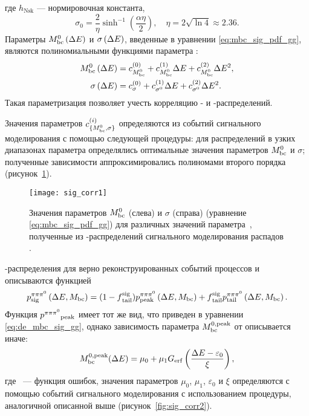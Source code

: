 где $h_{\textrm{Nsk}}$ --- нормировочная константа,
\begin{equation}\label{eq:NskParams}
 \sigma_0 = \frac{2}{\eta} \sinh^{-1}\left(\frac{\alpha\eta}{2}\right),\quad
 \eta = 2\sqrt{\ln{4}}\approx 2.36.
\end{equation}
Параметры $M_{\mathrm{bc}}^0\left(\Delta E\right)$ и $\sigma\left(\Delta E\right)$, введенные в уравнении \eqref{eq:mbc_sig_pdf_gg}, являются полиномиальными функциями параметра \de:
\begin{equation}\label{eq:de_mbc_sig_gg_corr}
\begin{split}
 M_{\mathrm{bc}}^0\left(\Delta E\right) &= c^{(0)}_{M_{\mathrm{bc}}^0} + c^{(1)}_{M_{\mathrm{bc}}^0}\Delta E + c^{(2)}_{M_{\mathrm{bc}}^0}\Delta E^2,\\
 \sigma\left(\Delta E\right) &= c^{(0)}_{\sigma} + c^{(1)}_{\sigma^0}\Delta E + c^{(2)}_{\sigma^0}\Delta E^2.
\end{split}
\end{equation}
Такая параметризация позволяет учесть корреляцию \de- и \mbc-распределений.  

Значения параметров $c^{(i)}_{\{M_{\mathrm{bc}}^0,\sigma\}}$ определяются из событий сигнального моделирования с помощью следующей процедуры: для \mbc распределений в узких диапазонах параметра \de определялись оптимальные значения параметров $M_{\mathrm{bc}}^0$ и $\sigma$; полученные зависимости аппроксимировались полиномами второго порядка (рисунок~\ref{fig:sig_corr1}).

\begin{figure}[H]
 \centering
  \texttt{[image: sig\_corr1]}\\
  \caption{Значения параметров $M_{\mathrm{bc}}^0$ (слева) и $\sigma$ (справа) (уравнение \eqref{eq:mbc_sig_pdf_gg}) для различных значений параметра~\de, полученные из \mbc-распределений сигнального моделирования распадов \bdpi.}
  \label{fig:sig_corr1}
\end{figure}

\de-\mbc распределения для верно реконструированных событий процессов \bdetappp и \bdomega описываются функцией
\begin{equation}\label{eq:de_mbc_ppp_pdf}
 p{}_{\mathrm{sig}}^{\pi\pi\pi^0}\left(\Delta E,M_{\mathrm{bc}}\right) = (1-f{}_{\mathrm{tail}}^{\textrm{sig}})p{}_{\mathrm{peak}}^{\pi\pi\pi^0}\left(\Delta E,M_{\mathrm{bc}}\right) + f{}_{\mathrm{tail}}^{\textrm{sig}} p{}_{\mathrm{tail}}^{\pi\pi\pi^0}\left(\Delta E,M_{\mathrm{bc}}\right).
\end{equation}
Функция $p^{\pi\pi\pi^0}{}_{\mathrm{peak}}$ имеет тот же вид, что приведен в уравнении \eqref{eq:de_mbc_sig_gg}, однако зависимость параметра $M_{\mathrm{bc}}^{0,{\mathrm{peak}}}$ от \de описывается иначе:
\begin{equation}
 M_{\mathrm{bc}}^{0,\mathrm{peak}}(\Delta E) = \mu_0 + \mu_1G_{\mathrm{erf}}\left(\frac{\Delta E-\varepsilon_0}{\xi}\right),
\end{equation}
где \erf\ --- функция ошибок, значения параметров $\mu_0$, $\mu_1$, $\varepsilon_0$ и $\xi$ определяются с помощью событий сигнального моделирования с использованием процедуры, аналогичной описанной выше (рисунок~\ref{fig:sig_corr2}). 

